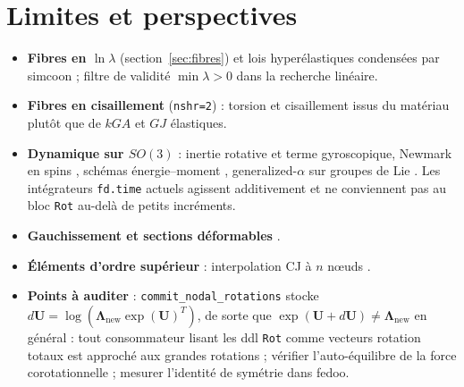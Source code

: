 \documentclass[11pt,a4paper]{article}
\newcommand{\Lam}{\bm{\Lambda}}
\newcommand{\code}[1]{\texttt{#1}}
\begin{document}
\section{Limites et perspectives}
\begin{itemize}
\item \textbf{Fibres en $\ln\lambda$} (section~\ref{sec:fibres}) et lois
hyperélastiques condensées par simcoon ; filtre de validité $\min\lambda>0$
dans la recherche linéaire.
\item \textbf{Fibres en cisaillement} (\code{nshr=2}) : torsion et cisaillement
issus du matériau plutôt que de $kGA$ et $GJ$ élastiques.
\item \textbf{Dynamique sur $SO(3)$} : inertie rotative et terme gyroscopique,
Newmark en spins \cite{simovuquoc1988}, schémas énergie--moment
\cite{simo1995,romero2002,jelenic1998}, generalized-$\alpha$ sur groupes de Lie
\cite{bruls2010}. Les intégrateurs \code{fd.time} actuels agissent
additivement et ne conviennent pas au bloc \code{Rot} au-delà de petits
incréments.
\item \textbf{Gauchissement et sections déformables}
\cite{simovuquoc1991,gruttmann1998,durville2012}.
\item \textbf{Éléments d'ordre supérieur} : interpolation CJ à $n$ nœuds
\cite{jelenic1999}.
\item \textbf{Points à auditer} : \code{commit\_nodal\_rotations} stocke
$d\mathbf U=\log(\Lam_{\text{new}}\exp(\mathbf U)^T)$, de sorte que
$\exp(\mathbf U+d\mathbf U)\ne\Lam_{\text{new}}$ en général : tout consommateur
lisant les ddl \code{Rot} comme vecteurs rotation totaux est approché aux
grandes rotations ; vérifier l'auto-équilibre de la force corotationnelle ;
mesurer l'identité de symétrie dans fedoo.
\end{itemize}
\end{document}
